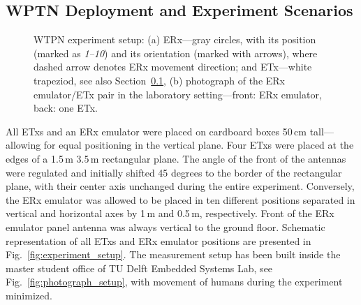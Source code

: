 \documentclass[11pt,draftclsnofoot,journal,onecolumn]{IEEEtran}
\begin{document}
\subsection{WPTN Deployment and Experiment Scenarios}
\label{sec:experiment_scenario}

\begin{figure}
\centering
{}
\caption{WTPN experiment setup: (a) ERx---gray circles, with its position (marked as \emph{1--10}) and its orientation (marked with arrows), where dashed arrow denotes ERx movement direction; and ETx---white trapeziod, see also Section~\ref{sec:experiment_scenario}, (b) photograph of the ERx emulator/ETx pair in the laboratory setting---front: ERx emulator, back: one ETx.}
\label{fig:wptn_setup}
\end{figure}

All ETxs and an ERx emulator were placed on cardboard boxes 50\,cm tall---allowing for equal positioning in the vertical plane. Four ETxs were placed at the edges of a 1.5\,m\,\,3.5\,m rectangular plane. The angle of the front of the antennas were regulated and initially shifted 45 degrees to the border of the rectangular plane, with their center axis unchanged during the entire experiment. Conversely, the ERx emulator was allowed to be placed in ten different positions separated in vertical and horizontal axes by 1\,m and 0.5\,m, respectively. Front of the ERx emulator panel antenna was always vertical to the ground floor. Schematic representation of all ETxs and ERx emulator positions are presented in Fig.~\ref{fig:experiment_setup}. The measurement setup has been built inside the master student office of TU Delft Embedded Systems Lab, see Fig.~\ref{fig:photograph_setup}, with movement of humans during the experiment minimized.
\end{document}
